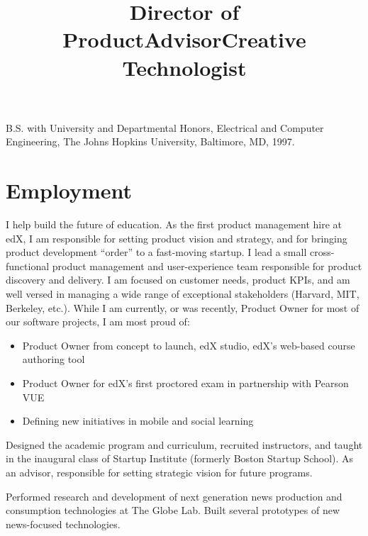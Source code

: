 \documentclass[line]{res}
\begin{document}
\begin{resume}
	B.S. with University and Departmental Honors, Electrical and Computer Engineering, The Johns Hopkins University, Baltimore, MD, 1997.
	
	\section{\sc Employment}

	\title{Director of Product} 
	 
	\begin{position}
		I help build the future of education. As the first product management hire
		at edX, I am responsible for setting product vision and strategy, and for
		bringing product development ``order'' to a fast-moving startup. I lead a
		small cross-functional product management and user-experience team
		responsible for product discovery and delivery. I am focused on customer
		needs, product KPIs, and am well versed in managing a wide range of
		exceptional stakeholders (Harvard, MIT, Berkeley, etc.). While I am
		currently, or was recently, Product Owner for most of our software projects,
		I am most proud of:		
		\begin{itemize}
			\item Product Owner from concept to launch, edX studio, edX's web-based course authoring tool
			\item Product Owner for edX's first proctored exam in partnership with Pearson VUE
			\item Defining new initiatives in mobile and social learning
		\end{itemize}
	\end{position}
	
	\title{Advisor} 
	 
	\begin{position}		
		Designed the academic program and curriculum, recruited instructors, and taught
		in the inaugural class of Startup Institute (formerly Boston Startup
		School). As an advisor, responsible for setting strategic vision for future
		programs.
	\end{position}
	
	\title{Creative Technologist} 
	  
	\begin{position}
		Performed research and development of next generation news production and consumption
    technologies at The Globe Lab. Built several prototypes of new news-focused technologies.
	\end{position}
	

\end{resume}
\end{document}
